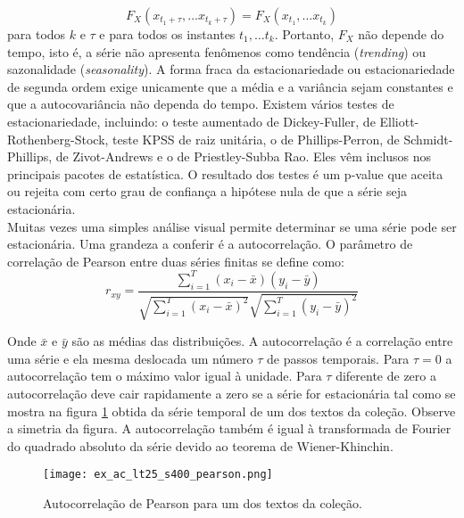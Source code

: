 \documentclass[a4paper,openright,12pt]{report} %
\begin{document}
\begin{equation}
F_X(x_{t_1+\tau}, \dots x_{t_k+\tau}) = F_X(x_{t_1}, \dots x_{t_k})
\end{equation}
para todos $k$ e $\tau$ e para todos os instantes $t_1, \dots t_k$. Portanto, $F_X$ n\~ao depende do tempo, isto \'e, a s\'erie n\~ao apresenta fen\^omenos como tend\^encia (\textit{trending}) ou sazonalidade (\textit{seasonality}). A forma fraca da estacionariedade ou estacionariedade de segunda ordem exige unicamente que a m\'edia e a vari\^ancia sejam constantes e que a autocovari\^ancia n\~ao dependa do tempo. Existem v\'arios testes de estacionariedade, incluindo: o teste aumentado de Dickey-Fuller, de Elliott-Rothenberg-Stock, teste KPSS de raiz unit\'aria, o de Phillips-Perron, de Schmidt-Phillips, de Zivot-Andrews e o de Priestley-Subba Rao. Eles v\^em inclusos nos principais pacotes de estat\'istica. O resultado dos testes \'e um p-value que aceita ou rejeita com certo grau de confian\c ca a hip\'otese nula de que a s\'erie seja estacion\'aria.\\

Muitas vezes uma simples an\'alise visual permite determinar se uma s\'erie pode ser estacion\'aria. Uma grandeza a conferir \'e a autocorrela\c c\~ao. O par\^ametro de correla\c c\~ao de Pearson entre duas s\'eries finitas se define como:
\begin{equation}
r_{xy} = \frac{\sum_{i=1}^T (x_i-\bar{x}) (y_i-\bar{y}) } {\sqrt{\sum_{i=1}^T (x_i-\bar{x})^2}\sqrt{\sum_{i=1}^T (y_i-\bar{y})^2}}
\end{equation}

Onde $\bar{x}$ e $\bar{y}$ s\~ao as m\'edias das distribui\c c\~oes. A autocorrela\c c\~ao \'e a correla\c c\~ao entre uma s\'erie e ela mesma deslocada um n\'umero $\tau$ de passos temporais. Para $\tau=0$ a autocorrela\c c\~ao tem o m\'aximo valor igual \`a unidade. Para $\tau$ diferente de zero a autocorrela\c c\~ao deve cair rapidamente a zero se a s\'erie for estacion\'aria tal como se mostra na figura \ref{fig:pearson_autocorrelation} obtida da s\'erie temporal de um dos textos da cole\c c\~ao. Observe a simetria da figura. A autocorrela\c c\~ao tamb\'em \'e igual \`a transformada de Fourier do quadrado absoluto da s\'erie devido ao teorema de Wiener-Khinchin.\\

\begin{figure}[t]%
\centering
\texttt{[image: ex\_ac\_lt25\_s400\_pearson.png]}
\caption{Autocorrela\c c\~ao de Pearson para um dos textos da cole\c c\~ao.}
\label{fig:pearson_autocorrelation}
\end{figure}
\end{document}
